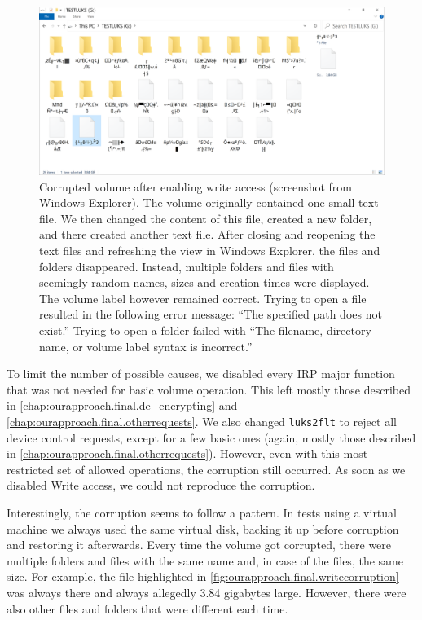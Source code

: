 \begin{figure}[htb!]
	\center
	\includegraphics[scale=0.47]{../img/ourapproach.final.writecorruption.png}
	\caption[
		Corrupted volume after enabling write access
	]{
		Corrupted volume after enabling write access (screenshot from Windows Explorer). The volume originally contained one small text file. We then changed the content of this file, created a new folder, and there created another text file. After closing and reopening the text files and refreshing the view in Windows Explorer, the files and folders disappeared. Instead, multiple folders and files with seemingly random names, sizes and creation times were displayed. The volume label however remained correct. Trying to open a file resulted in the following error message: ``The specified path does not exist.'' Trying to open a folder failed with ``The filename, directory name, or volume label syntax is incorrect.''
	}
	\label{fig:ourapproach.final.writecorruption}
\end{figure}

To limit the number of possible causes, we disabled every IRP major function that was not needed for basic volume operation. This left mostly those described in \autoref{chap:ourapproach.final.de_encrypting} and \autoref{chap:ourapproach.final.otherrequests}. We also changed \texttt{luks2flt} to reject all device control requests, except for a few basic ones (again, mostly those described in \autoref{chap:ourapproach.final.otherrequests}). However, even with this most restricted set of allowed operations, the corruption still occurred. As soon as we disabled Write access, we could not reproduce the corruption.

Interestingly, the corruption seems to follow a pattern. In tests using a virtual machine we always used the same virtual disk, backing it up before corruption and restoring it afterwards. Every time the volume got corrupted, there were multiple folders and files with the same name and, in case of the files, the same size. For example, the file highlighted in \autoref{fig:ourapproach.final.writecorruption} was always there and always allegedly 3.84 gigabytes large. However, there were also other files and folders that were different each time.

